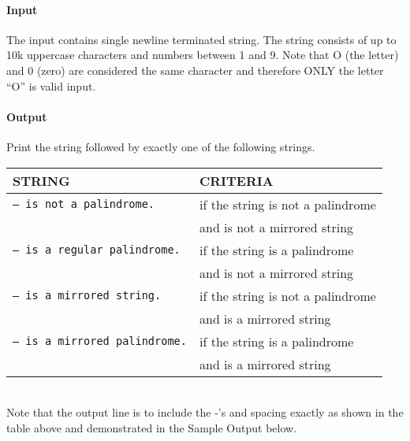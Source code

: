 \paragraph*{Input}

The input contains single newline terminated string.
The string consists of up to 10k uppercase characters and numbers between 1 and 9. 
Note that O (the letter) and 0 (zero) are considered the same character and therefore ONLY the letter ``O'' is valid input.

\paragraph*{Output}

Print the string followed by exactly one of the following strings.\\

\begin{tabular}{l|l}
STRING & CRITERIA\\
\hline
\texttt{-- is not a palindrome.} & if the string is not a palindrome\\ & and is not a mirrored string\\
\hline
\texttt{-- is a regular palindrome.} & if the string is a palindrome\\ &  and is not a mirrored string\\
\hline
\texttt{-- is a mirrored string.} & if the string is not a palindrome\\ &  and is a mirrored string\\
\hline
\texttt{-- is a mirrored palindrome.} & if the string is a palindrome\\ &  and is a mirrored string\\
\end{tabular}\\

Note that the output line is to include the -'s and spacing exactly as shown in the table above and demonstrated in the Sample Output below.

\begin{samples}[0.5] %
\end{samples}



